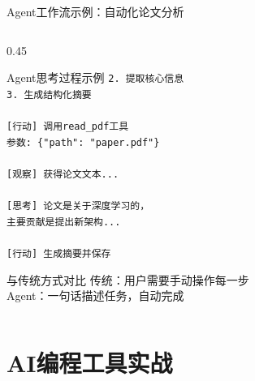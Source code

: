 \documentclass[aspectratio=169,11pt]{beamer}
\begin{document}
\begin{frame}{Agent工作流示例：自动化论文分析}
\begin{columns}
\begin{column}{0.45\textwidth}
\begin{exampleblock}{Agent思考过程示例}
                \texttt{2. 提取核心信息}\\
                \texttt{3. 生成结构化摘要}\\
                \texttt{}\\
                \texttt{[行动] 调用read\_pdf工具}\\
                \texttt{参数: \{"path": "paper.pdf"\}}\\
                \texttt{}\\
                \texttt{[观察] 获得论文文本...}\\
                \texttt{}\\
                \texttt{[思考] 论文是关于深度学习的，}\\
                \texttt{主要贡献是提出新架构...}\\
                \texttt{}\\
                \texttt{[行动] 生成摘要并保存}
            \end{exampleblock}
            
            \vspace{0.2cm}
            \begin{block}{与传统方式对比}
                \scriptsize
                传统：用户需要手动操作每一步\\
                Agent：一句话描述任务，自动完成
            \end{block}
        \end{column}
    \end{columns}
\end{frame}

\section{AI编程工具实战}
\end{document}
